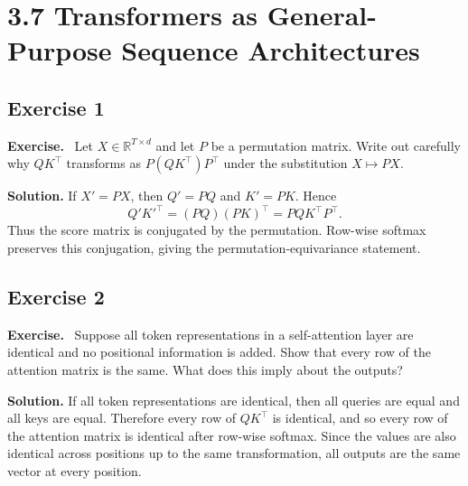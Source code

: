 \documentclass[11pt]{article}
\newenvironment{exercisebox}{\begin{framed}\noindent\textbf{Exercise.}\ }{\end{framed}}
\begin{document}
\section{3.7 Transformers as General-Purpose Sequence Architectures}
\subsection*{Exercise 1}
\begin{exercisebox}
Let \(X \in \mathbb{R}^{T \times d}\) and let \(P\) be a permutation matrix.
    Write out carefully why \(QK^{\top}\) transforms as \(P(QK^{\top})P^{\top}\) under the substitution \(X \mapsto PX\).
\end{exercisebox}
\textbf{Solution.} If $X' = PX$, then $Q'=PQ$ and $K'=PK$. Hence
\[
Q'{K'}^\top=(PQ)(PK)^\top = P Q K^\top P^\top.
\]
Thus the score matrix is conjugated by the permutation. Row-wise softmax preserves this conjugation, giving the permutation-equivariance statement.

\subsection*{Exercise 2}
\begin{exercisebox}
Suppose all token representations in a self-attention layer are identical and no positional information is added.
    Show that every row of the attention matrix is the same.
    What does this imply about the outputs?
\end{exercisebox}
\textbf{Solution.} If all token representations are identical, then all queries are equal and all keys are equal. Therefore every row of $QK^\top$ is identical, and so every row of the attention matrix is identical after row-wise softmax. Since the values are also identical across positions up to the same transformation, all outputs are the same vector at every position.
\end{document}
